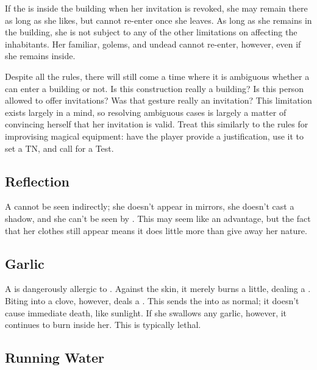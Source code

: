 If the {\vampire} is inside the building when her invitation is revoked, she may remain there as long as she likes, but cannot re-enter once she leaves.
As long as she remains in the building, she is not subject to any of the other limitations on affecting the inhabitants.
Her familiar, golems, and undead cannot re-enter, however, even if she remains inside.

Despite all the rules, there will still come a time where it is ambiguous whether a {\vampire} can enter a building or not.
Is this construction really a building?
Is this person allowed to offer invitations?
Was that gesture really an invitation?
This limitation exists largely in a {\vampirepossessive} mind, so resolving ambiguous cases is largely a matter of convincing herself that her invitation is valid.
Treat this similarly to the rules for improvising magical equipment: have the player provide a justification, use it to set a TN, and call for a  Test.

\subsection{Reflection}

A {\vampire} cannot be seen indirectly; she doesn't appear in mirrors, she doesn't cast a shadow, and she can't be seen by .
This may seem like an advantage, but the fact that her clothes still appear means it does little more than give away her {\vampiric} nature.

\subsection{Garlic}

A {\vampires} is dangerously allergic to .
Against the skin, it merely burns a little, dealing a  {\damagetest}.
Biting into a clove, however, deals a  {\damagetest}.
This {\damagetest} sends the {\vampire} into {\shock} as normal; it doesn't cause immediate death, like sunlight.
If she swallows any garlic, however, it continues to burn inside her.
This is typically lethal.

\subsection{Running Water}


